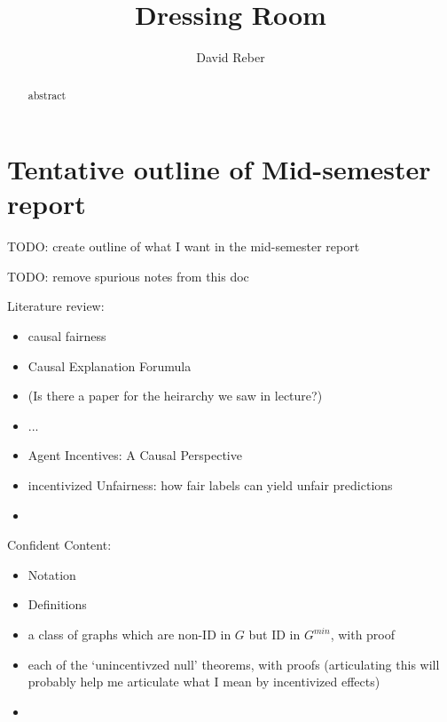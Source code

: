 \documentclass[letterpaper,10pt]{article}
\begin{document}
\title{Dressing Room}

\author{David Reber}
\address{Columbia University}


\begin{abstract}
abstract
\end{abstract}


\section{Tentative outline of Mid-semester report}

\color{red} TODO: create outline of what I want in the mid-semester report \color{black}

\color{red} TODO: remove spurious notes from this doc \color{black}

Literature review:
\begin{itemize}
  \item causal fairness
  \item Causal Explanation Forumula
  \item (Is there a paper for the heirarchy we saw in lecture?)
  \item ...
  \item Agent Incentives: A Causal Perspective
  \item incentivized Unfairness: how fair labels can yield unfair predictions
  \item 
\end{itemize}

Confident Content:
\begin{itemize}
  \item Notation
  \item Definitions
  \item a class of graphs which are non-ID in $G$ but ID in $G^{min}$, with proof
  \item each of the `unincentivzed null' theorems, with proofs (articulating this will probably help me articulate what I mean by incentivized effects)
  \item 
\end{itemize}
\end{document}
